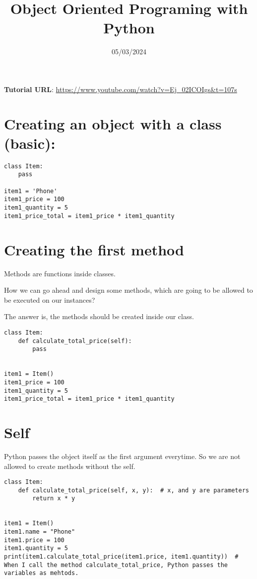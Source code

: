 \documentclass{article}
\begin{document}
\title{Object Oriented Programing with Python}
\date{05/03/2024}
\maketitle
\tableofcontents
\pagebreak

\textbf{Tutorial URL}:
\url{https://www.youtube.com/watch?v=Ej_02ICOIgs&t=107s}

\section{Creating an object with a class (basic):}
\begin{lstlisting}
class Item:
	pass

item1 = 'Phone'
item1_price = 100
item1_quantity = 5
item1_price_total = item1_price * item1_quantity
\end{lstlisting}

\section{Creating the first method}
Methods are functions inside classes.

How we can go ahead and design some methods, which are going to be allowed to be executed on our instances?

The answer is, the methods should be created inside our class.

\begin{lstlisting}
class Item:
	def calculate_total_price(self):
		pass
	
	
item1 = Item()
item1_price = 100
item1_quantity = 5
item1_price_total = item1_price * item1_quantity
\end{lstlisting}

\section{Self}
Python passes the object itself as the first argument everytime. So we are not allowed to create methods without the self. 

\begin{lstlisting}
class Item:
	def calculate_total_price(self, x, y):  # x, and y are parameters
		return x * y


item1 = Item()
item1.name = "Phone"
item1.price = 100
item1.quantity = 5
print(item1.calculate_total_price(item1.price, item1.quantity))  # When I call the method calculate_total_price, Python passes the variables as mehtods.
\end{lstlisting}
\end{document}
